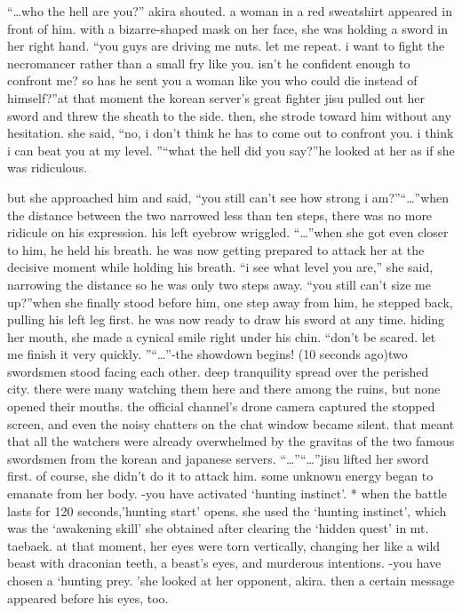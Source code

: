 “…who the hell are you?” akira shouted.
a woman in a red sweatshirt appeared in front of him.
 with a bizarre-shaped mask on her face, she was holding a sword in her right hand.
“you guys are driving me nuts.
 let me repeat.
 i want to fight the necromancer rather than a small fry like you.
 isn’t he confident enough to confront me? so has he sent you a woman like you who could die instead of himself?”at that moment the korean server’s great fighter jisu pulled out her sword and threw the sheath to the side.
 then, she strode toward him without any hesitation.
she said, “no, i don’t think he has to come out to confront you.
 i think i can beat you at my level.
”“what the hell did you say?”he looked at her as if she was ridiculous.

but she approached him and said, “you still can’t see how strong i am?”“…”when the distance between the two narrowed less than ten steps, there was no more ridicule on his expression.
 his left eyebrow wriggled.
“…”when she got even closer to him, he held his breath.
 he was now getting prepared to attack her at the decisive moment while holding his breath.
“i see what level you are,” she said, narrowing the distance so he was only two steps away.
“you still can’t size me up?”when she finally stood before him, one step away from him, he stepped back, pulling his left leg first.
 he was now ready to draw his sword at any time.
hiding her mouth, she made a cynical smile right under his chin.
“don’t be scared.
 let me finish it very quickly.
”“…”-the showdown begins! (10 seconds ago)two swordsmen stood facing each other.
deep tranquility spread over the perished city.
 there were many watching them here and there among the ruins, but none opened their mouths.
the official channel’s drone camera captured the stopped screen, and even the noisy chatters on the chat window became silent.
that meant that all the watchers were already overwhelmed by the gravitas of the two famous swordsmen from the korean and japanese servers.
“…”“…”jisu lifted her sword first.
 of course, she didn’t do it to attack him.
 some unknown energy began to emanate from her body.
-you have activated ‘hunting instinct’.
* when the battle lasts for 120 seconds,’hunting start’ opens.
she used the ‘hunting instinct’, which was the ‘awakening skill’ she obtained after clearing the ‘hidden quest’ in mt.
 taebaek.
at that moment, her eyes were torn vertically, changing her like a wild beast with draconian teeth, a beast’s eyes, and murderous intentions.
-you have chosen a ‘hunting prey.
’she looked at her opponent, akira.
 then a certain message appeared before his eyes, too.
